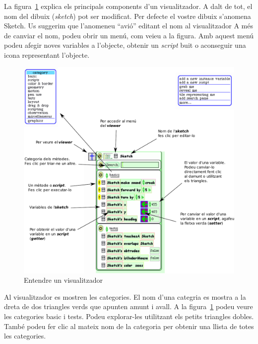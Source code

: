 La figura~\ref{fig2405} explica els principals components d'un visualitzador. A dalt de tot, el nom del dibuix (\emph{sketch}) pot ser modificat. Per defecte el vostre dibuix s'anomena \textsf{Sketch}. Us suggerim que l'anomeneu ``avió'' editant el nom al visualitzador A més de canviar el nom, podeu obrir un menú, com veieu a la figura. Amb aquest menú podeu afegir noves variables a l'objecte, obtenir un \emph{script} buit o aconseguir una icona representant l'objecte. 
\newpage
\begin{figure}
\begin{center}
\includegraphics[scale=0.7]{Imatges/figura24-5}
\end{center}
\caption{Entendre un visualitzador}
\label{fig2405}
\end{figure}
\newpage
Al visualitzador es mostren les categories. El nom d'una categria es mostra a la dreta de dos triangles verds que apunten amunt i avall. A la figura~\ref{fig2405} podeu veure les categories \textsf{basic} i \textsf{tests}. Podeu explorar-les utilitzant els petits triangles dobles. També podeu fer clic al mateix nom de la categoria per obtenir una llista de totes les categories.  


